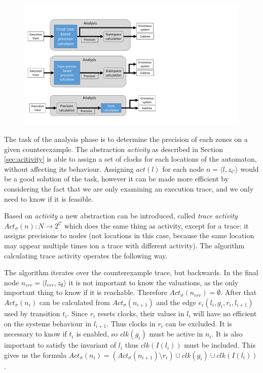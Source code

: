 \begin{figure}[h]
	\centering
	\includegraphics[width=\textwidth]{include/figures/modules_ssp_anal_act}
\end{figure}

The task of the analysis phase is to determine the precision of each zones on a given counterexample. The abstraction \emph{activity} as described in Section \ref{sec:acitivity} is able to assign a set of clocks for each locations of the automaton, without affecting its behaviour. Assigning $act(l)$ for each node $n=\langle l, z_{C} \rangle$ would be a good solution of the task, however it can be made more efficient by considering the fact that we are only examining an execution trace, and we only need to know if it is feasible.

Based on \emph{activity} a new abstraction can be introduced, called \emph{trace activity} $Act_\sigma(n): N \to 2^\mathcal{C}$ which does the same thing as activity, except for a trace: it assigns precisions to nodes (not locations in this case, because the same location may appear multiple times ion a trace with different activity). The algorithm calculating trace activity operates the following way.

The algorithm iterates over the counterexample trace, but backwards. In the final node  $n_{err}=\langle l_{err}, z_{\emptyset} \rangle$ it is not important to know the valuations, as the only important thing to know if it is reachable. Therefore $Act_\sigma(n_{err})=\emptyset$. After that $Act_\sigma(n_i)$ can be calculated from $Act_\sigma(n_{i+1})$ and the edge $e_i(l_i,g_i,r_i,l_{i+1})$ used by transition $t_i$. Since $r_i$ resets clocks, their values in $l_i$ will have no efficient on the systems behaviour in $l_{i+1}$. Thus clocks in $r_i$ can be excluded. It is necessary to know if $t_i$ is enabled, so $\textit{clk}(g_i)$ must be active in $n_i$. It is also important to satisfy the invariant of $l_i$ thus $\textit{clk}(I(l_i))$ must be included. This gives us the formula $Act_\sigma(n_i)=(Act_\sigma(n_{i+1}) \setminus r_i) \cup \textit{clk}(g_i) \cup \textit{clk}(I(l_i))$. 

